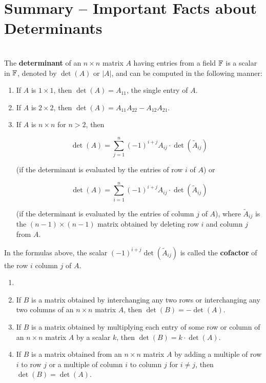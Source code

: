 \section{Summary -- Important Facts about Determinants}

\begin{definition}
	\hfill\\
	The \textbf{determinant} of an $n \times n$ matrix $A$ having entries from a field $\mathbb{F}$ is a scalar in $\mathbb{F}$, denoted by $\det(A)$ or $|A|$, and can be computed in the following manner:

	\begin{enumerate}
		\item If $A$ is $1 \times 1$, then $\det(A) = A_{11}$, the single entry of $A$.
		\item If $A$ is $2 \times 2$, then $\det(A) = A_{11}A_{22} - A_{12}A_{21}$.
		\item If $A$ is $n \times n$ for $n > 2$, then

		      \[\det(A) = \sum_{j=1}^{n}(-1)^{i+j}A_{ij}\cdot\det(\tilde{A}_{ij})\]

		      (if the determinant is evaluated by the entries of row $i$ of $A$) or

		      \[\det(A) = \sum_{i=1}^{n}(-1)^{i+j}A_{ij}\cdot\det(\tilde{A}_{ij})\]

		      (if the determinant is evaluated by the entries of column $j$ of $A$), where $\tilde{A}_{ij}$ is the $(n-1) \times (n-1)$ matrix obtained by deleting row $i$ and column $j$ from $A$.
	\end{enumerate}

	In the formulas above, the scalar $(-1)^{i+j}\det(\tilde{A}_{ij})$ is called the \textbf{cofactor} of the row $i$ column $j$ of $A$.
\end{definition}

\begin{definition}
	\begin{enumerate}
		\item[]
		\item If $B$ is a matrix obtained by interchanging any two rows or interchanging any two columns of an $n \times n$ matrix $A$, then $\det(B) = -\det(A)$.
		\item If $B$ is a matrix obtained by multiplying each entry of some row or column of an $n \times n$ matrix $A$ by a scalar $k$, then $\det(B) = k\cdot\det(A)$.
		\item If $B$ is a matrix obtained from an $n \times n$ matrix $A$ by adding a multiple of row $i$ to row $j$ or a multiple of column $i$ to column $j$ for $i \neq j$, then $\det(B) = \det(A)$.
	\end{enumerate}
\end{definition}
